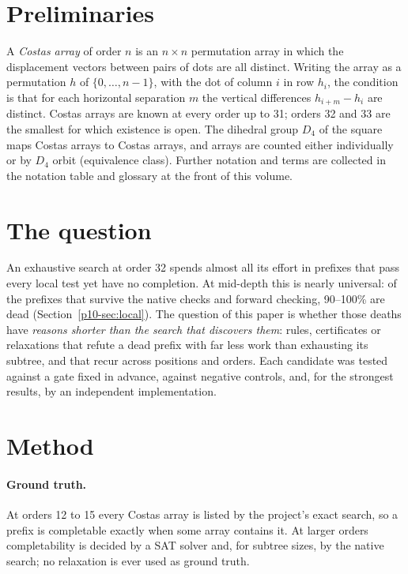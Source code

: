 \documentclass[11pt,a4paper,oneside]{report}
\theoremstyle{definition}
\begin{document}
\section{Preliminaries}\label{p10-sec:notation}
A \emph{Costas array} of order $n$ is an $n\times n$ permutation array in which the displacement
vectors between pairs of dots are all distinct. Writing the array as a permutation $h$ of
$\{0,\dots,n-1\}$, with the dot of column $i$ in row $h_i$, the condition is that for each
horizontal separation $m$ the vertical differences $h_{i+m}-h_i$ are distinct. Costas arrays are
known at every order up to 31; orders 32 and 33 are the smallest for which existence is open. The
dihedral group $D_4$ of the square maps Costas arrays to Costas arrays, and arrays are counted
either individually or by $D_4$ orbit (equivalence class). Further notation and terms are collected
in the notation table and glossary at the front of this volume.

\section{The question}
\label{p10-sec:question}
An exhaustive search at order 32 spends almost all its effort in prefixes that pass every local test yet have
no completion. At mid-depth this is nearly universal: of the prefixes that survive the native checks and
forward checking, 90--100\% are dead (Section~\ref{p10-sec:local}). The question of this paper is whether those
deaths have \emph{reasons shorter than the search that discovers them}: rules, certificates or relaxations
that refute a dead prefix with far less work than exhausting its subtree, and that recur across positions
and orders. Each candidate was tested against a gate fixed in advance, against negative controls, and,
for the strongest results, by an independent implementation.

\section{Method}
\label{p10-sec:method}
\paragraph{Ground truth.} At orders 12 to 15 every Costas array is listed by the project's exact search, so a
prefix is completable exactly when some array contains it. At larger orders completability is decided by
a SAT solver and, for subtree sizes, by the native search; no relaxation is ever used as ground truth.
\end{document}
